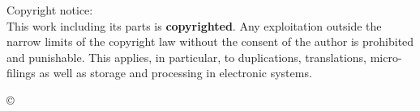 \begin{titlepage}
\begin{flushleft}
			
			
			\small
			Copyright notice:\\
			
			This work including its parts is \textbf{copyrighted}. Any exploitation outside the narrow limits of the copyright law without the consent of the author is prohibited and punishable. This applies, in particular, to duplications, translations, micro-filings as well as storage and processing in electronic systems.
		\end{flushleft}
		\begin{flushright}
			\copyright{} \the\year
		\end{flushright}
	\end{titlepage}
	
	
